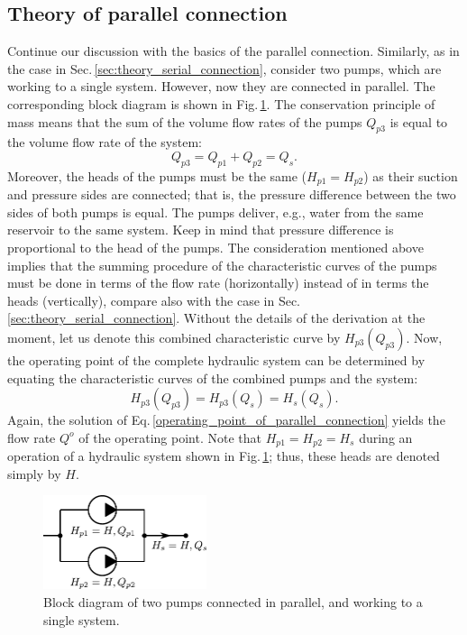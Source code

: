 \subsection{Theory of parallel connection}
Continue our discussion with the basics of the parallel connection. Similarly, as in the case in Sec.\,\ref{sec:theory_serial_connection}, consider two pumps, which are working to a single system. However, now they are connected in parallel. The corresponding block diagram is shown in Fig.\,\ref{fig:block_diagram_parallel_connection}. The conservation principle of mass means that the sum of the volume flow rates of the pumps $Q_{p3}$ is equal to the volume flow rate of the system:
%
\begin{equation} \label{conservation_of_mass_parallel_connection}
Q_{p3} = Q_{p1} + Q_{p2} = Q_s.
\end{equation}
%
Moreover, the heads of the pumps must be the same ($H_{p1}=H_{p2}$) as their suction and pressure sides are connected; that is, the pressure difference between the two sides of both pumps is equal. The pumps deliver, e.g., water from the same reservoir to the same system. Keep in mind that pressure difference is proportional to the head of the pumps. The consideration mentioned above implies that the summing procedure of the characteristic curves of the pumps must be done in terms of the flow rate (horizontally) instead of in terms the heads (vertically), compare also with the case in Sec.\,\ref{sec:theory_serial_connection}. Without the details of the derivation at the moment, let us denote this combined characteristic curve by $H_{p3}(Q_{p3})$. Now, the operating point of the complete hydraulic system can be determined by equating the characteristic curves of the combined pumps and the system:
%
\begin{equation} \label{operating_point_of_parallel_connection}
H_{p3}(Q_{p3}) = H_{p3}(Q_s) = H_s(Q_s).
\end{equation}
%
Again, the solution of Eq.\,\eqref{operating_point_of_parallel_connection} yields the flow rate $Q^o$ of the operating point. Note that $H_{p1}=H_{p2}=H_s$ during an operation of a hydraulic system shown in Fig.\,\ref{fig:block_diagram_parallel_connection}; thus, these heads are denoted simply by $H$.

\begin{figure}[ht!]
	\centering
		\includegraphics[height=2.75cm]{Control/Figures/Block_Diagram_Parallel_Connection.pdf}
	\caption{Block diagram of two pumps connected in parallel, and working to a single system.}
	\label{fig:block_diagram_parallel_connection}
\end{figure}

